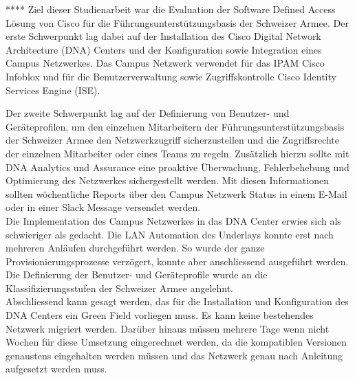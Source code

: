 ****
Ziel dieser Studienarbeit war die Evaluation der Software Defined Access Lösung von Cisco für die Führungsunterstützungsbasis der Schweizer Armee. Der erste Schwerpunkt lag dabei auf der Installation des Cisco Digital Network Architecture (DNA) Centers und der Konfiguration sowie Integration eines Campus Netzwerkes. Das Campus Netzwerk verwendet für das IPAM Cisco Infoblox und für die Benutzerverwaltung sowie Zugriffskontrolle Cisco Identity Services Engine (ISE).

Der zweite Schwerpunkt lag auf der Definierung von Benutzer- und Geräteprofilen, um den einzelnen Mitarbeitern der Führungsunterstützungsbasis der Schweizer Armee den Netzwerkzugriff sicherzustellen und die Zugriffsrechte der einzelnen Mitarbeiter oder eines Teams zu regeln. Zusätzlich hierzu sollte mit DNA Analytics und Assurance eine proaktive Überwachung, Fehlerbehebung und Optimierung des Netzwerkes sichergestellt werden. Mit diesen Informationen sollten wöchentliche Reports über den Campus Netzwerk Status in einem E-Mail oder in einer Slack Message versendet werden.
\\

Die Implementation des Campus Netzwerkes in das DNA Center erwies sich als schwieriger als gedacht. Die LAN Automation des Underlays konnte erst nach mehreren Anläufen durchgeführt werden. So wurde der ganze Provisionierungsprozesse verzögert, konnte aber anschliessend ausgeführt werden. Die Definierung der Benutzer- und Geräteprofile wurde an die Klassifizierungsstufen der Schweizer Armee angelehnt.
\\

Abschliessend kann gesagt werden, das für die Installation und Konfiguration des DNA Centers ein Green Field vorliegen muss. Es kann keine bestehendes Netzwerk migriert werden. Darüber hinaus müssen mehrere Tage wenn nicht Wochen für diese Umsetzung eingerechnet werden, da die kompatiblen Versionen genaustens eingehalten werden müssen und das Netzwerk genau nach Anleitung aufgesetzt werden muss.


